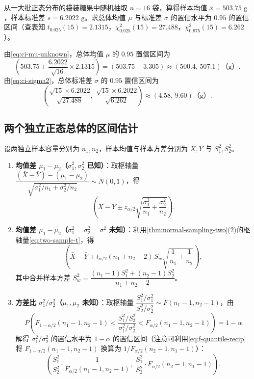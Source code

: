 \begin{example}[title={袋装糖果质量的均值与标准差置信区间}]
\label{eg:candy-ci}
从一大批正态分布的袋装糖果中随机抽取 $n=16$ 袋，算得样本均值 $\bar{x}=503.75\text{ g}$，样本标准差 $s=6.2022\text{ g}$。求总体均值 $\mu$ 与标准差 $\sigma$ 的置信水平为 $0.95$ 的置信区间（查表知 $t_{0.025}(15)=2.1315$，$\chi_{0.025}^2(15)=27.488$，$\chi_{0.975}^2(15)=6.262$）。
\begin{solution}
由\eqref{eq:ci-mu-unknown}，总体均值 $\mu$ 的 $0.95$ 置信区间为
\[
  \left(503.75\pm\frac{6.2022}{\sqrt{16}}\times 2.1315\right)=(503.75\pm 3.305)\approx(500.4,\,507.1)\text{（g）}.
\]
由\eqref{eq:ci-sigma2}，总体标准差 $\sigma$ 的 $0.95$ 置信区间为
\[
  \left(\frac{\sqrt{15}\times 6.2022}{\sqrt{27.488}},\;\frac{\sqrt{15}\times 6.2022}{\sqrt{6.262}}\right)
  \approx(4.58,\,9.60)\text{（g）}.
\]
\end{solution}
\end{example}

\subsection{两个独立正态总体的区间估计}

设两独立样本容量分别为 $n_1,n_2$，样本均值与样本方差分别为 $\bar{X},\bar{Y}$ 与 $S_1^2,S_2^2$。

\begin{enumerate}
  \item \textbf{均值差 $\mu_1-\mu_2$（$\sigma_1^2,\sigma_2^2$ 已知）}：取枢轴量 $\dfrac{(\bar{X}-\bar{Y})-(\mu_1-\mu_2)}{\sqrt{\sigma_1^2/n_1+\sigma_2^2/n_2}}\sim N(0,1)$，得
  \begin{equation}
    \left(\bar{X}-\bar{Y}\pm z_{\alpha/2}\sqrt{\frac{\sigma_1^2}{n_1}+\frac{\sigma_2^2}{n_2}}\right).
    \label{eq:ci-diff-known}
  \end{equation}
  \item \textbf{均值差 $\mu_1-\mu_2$（$\sigma_1^2=\sigma_2^2=\sigma^2$ 未知）}：利用\cref{thm:normal-sampling-two}(2)的枢轴量\eqref{eq:two-sample-t}，得
  \begin{equation}
    \left(\bar{X}-\bar{Y}\pm t_{\alpha/2}(n_1+n_2-2)\,S_w\sqrt{\frac{1}{n_1}+\frac{1}{n_2}}\right),
    \label{eq:ci-diff-pooled}
  \end{equation}
  其中合并样本方差 $S_w^2=\dfrac{(n_1-1)S_1^2+(n_2-1)S_2^2}{n_1+n_2-2}$。
  \item \textbf{方差比 $\sigma_1^2/\sigma_2^2$（$\mu_1,\mu_2$ 未知）}：取枢轴量 $\dfrac{S_1^2/\sigma_1^2}{S_2^2/\sigma_2^2}\sim F(n_1-1,n_2-1)$，由
  \[
    P\!\left(F_{1-\alpha/2}(n_1-1,n_2-1)<\frac{S_1^2/S_2^2}{\sigma_1^2/\sigma_2^2}<F_{\alpha/2}(n_1-1,n_2-1)\right)=1-\alpha
  \]
  解得 $\sigma_1^2/\sigma_2^2$ 的置信水平为 $1-\alpha$ 的置信区间（注意可利用\eqref{eq:f-quantile-recip}将 $F_{1-\alpha/2}(n_1-1,n_2-1)$ 换算为 $1/F_{\alpha/2}(n_2-1,n_1-1)$）：
  \begin{equation}
    \left(\frac{S_1^2}{S_2^2}\cdot\frac{1}{F_{\alpha/2}(n_1-1,n_2-1)},\;\frac{S_1^2}{S_2^2}\cdot F_{\alpha/2}(n_2-1,n_1-1)\right).
    \label{eq:ci-var-ratio}
  \end{equation}
\end{enumerate}

